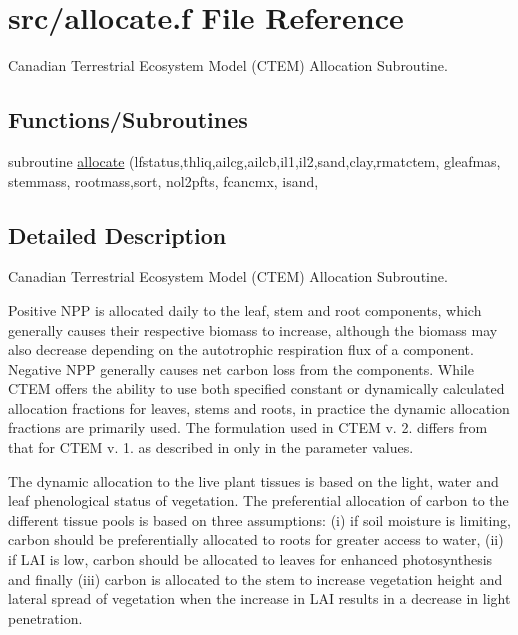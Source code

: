 \hypertarget{allocate_8f}{}\section{src/allocate.f File Reference}
\label{allocate_8f}


Canadian Terrestrial Ecosystem Model (C\+T\+E\+M) Allocation Subroutine.  


\subsection*{Functions/\+Subroutines}
\begin{DoxyCompactItemize}
\item 
subroutine \hyperlink{allocate_8f_aa4327082169256da29b83bf41b489db6}{allocate} (lfstatus,thliq,ailcg,ailcb,il1,il2,sand,clay,rmatctem, gleafmas, stemmass, rootmass,sort, nol2pfts, fcancmx, isand,
\end{DoxyCompactItemize}


\subsection{Detailed Description}
Canadian Terrestrial Ecosystem Model (C\+T\+E\+M) Allocation Subroutine. 

Positive N\+P\+P is allocated daily to the leaf, stem and root components, which generally causes their respective biomass to increase, although the biomass may also decrease depending on the autotrophic respiration flux of a component. Negative N\+P\+P generally causes net carbon loss from the components. While C\+T\+E\+M offers the ability to use both specified constant or dynamically calculated allocation fractions for leaves, stems and roots, in practice the dynamic allocation fractions are primarily used. The formulation used in C\+T\+E\+M v. 2. differs from that for C\+T\+E\+M v. 1. as described in \cite{Arora2005-6b1} only in the parameter values.

The dynamic allocation to the live plant tissues is based on the light, water and leaf phenological status of vegetation. The preferential allocation of carbon to the different tissue pools is based on three assumptions\+: (i) if soil moisture is limiting, carbon should be preferentially allocated to roots for greater access to water, (ii) if L\+A\+I is low, carbon should be allocated to leaves for enhanced photosynthesis and finally (iii) carbon is allocated to the stem to increase vegetation height and lateral spread of vegetation when the increase in L\+A\+I results in a decrease in light penetration.

